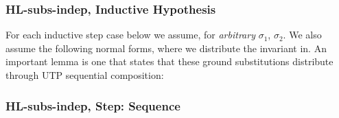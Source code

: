 \subsubsection{\textsf{HL-subs-indep}, Inductive Hypothesis}

For each inductive step case below we assume,
for \emph{arbitrary} $\sigma_1$, $\sigma_2$.
We also assume the following normal forms,
where we distribute the invariant in.
An important lemma is one that states that these ground substitutions
distribute through UTP sequential composition:

\subsubsection{\textsf{HL-subs-indep}, Step: Sequence}

